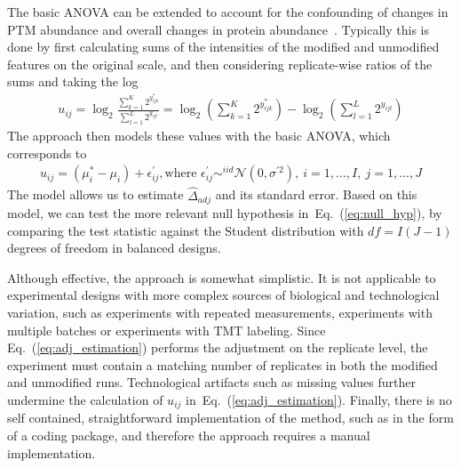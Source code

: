 \documentclass[mcp]{article}
\numberwithin{table}{section}
\def\eqref#1{Eq.~(\ref{eq:#1})}
\begin{document}
\medskip \noindent 
The basic ANOVA can be extended to account for the confounding of changes in PTM abundance and overall changes in protein abundance~\cite{Schwammle2015,THOMAS2020,Mertins:2013}. Typically this is done by first calculating sums of the intensities of the modified and unmodified features on the original scale, and then considering replicate-wise ratios of the sums and taking the log
\begin{eqnarray}
u_{ij} = \log_2 \frac{ \sum_{k=1}^{K} 2^{y_{ijk}^{\ast}} }{ \sum_{l=1}^{L} 2^{y_{ijl}} } = \log_2 \left( \sum_{k=1}^{K} 2^{y_{ijk}^{\ast}} \right) - \log_2 \left( \sum_{l=1}^{L} 2^{y_{ijl}} \right)
\label{eq:adj_estimation}
\end{eqnarray}
The approach then models these values with the basic ANOVA, which corresponds to 
\begin{eqnarray}
u_{ij} = (\mu^{\ast}_{i}-\mu_i) + \epsilon^{\prime}_{ij}, \text{where } \epsilon^{\prime}_{ij} \mathop\sim^{iid} \mathcal{N}(0, \sigma^{\prime 2}),\ i=1,\ldots,I,\ j=1,\ldots,J
\label{eq:ttest_ratio_model}
\end{eqnarray}
The model allows us to estimate $\hat{\Delta}_{adj}$ and its standard error.
Based on this model, we can test the more relevant null hypothesis in~\eqref{null_hyp}, by comparing the test statistic against the Student distribution with $df=I(J-1)$ degrees of freedom in balanced designs.

Although effective, the approach is somewhat simplistic. It is not applicable to experimental designs with more complex sources of biological and technological variation, such as experiments with repeated measurements, experiments with multiple batches or experiments with TMT labeling. Since \eqref{adj_estimation} performs the adjustment on the replicate level, the experiment must contain a matching number of replicates in both the modified and unmodified runs. Technological artifacts such as missing values further undermine the calculation of $u_{ij}$ in~\eqref{adj_estimation}. Finally, there is no self contained, straightforward implementation of the method, such as in the form of a coding package, and therefore the approach requires a manual implementation.

\medskip {} 
\end{document}

